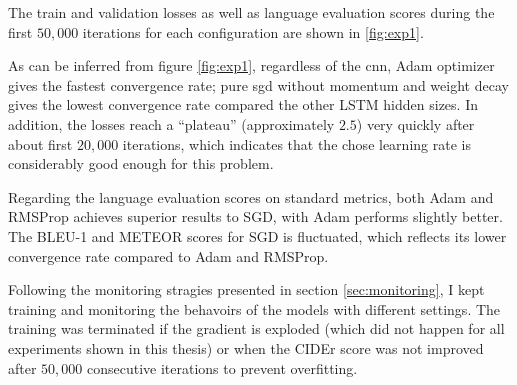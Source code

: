 The train and validation losses as well as language evaluation scores during the first $50,000$ iterations for each configuration are shown in \ref{fig:exp1}. 

As can be inferred from figure \ref{fig:exp1}, regardless of the \gls{cnn}, Adam optimizer gives the fastest convergence rate; pure \gls{sgd} without momentum and weight decay gives the lowest convergence rate compared the other LSTM hidden sizes. In addition, the losses reach a ``plateau'' (approximately $2.5$) very quickly after about first $20,000$ iterations, which indicates that the chose learning rate is considerably good enough for this problem.  

Regarding the language evaluation scores on standard metrics, both Adam and RMSProp achieves superior results to SGD, with Adam performs slightly better. The BLEU-1 and METEOR scores for SGD is fluctuated, which reflects its lower convergence rate compared to Adam and RMSProp.

Following the monitoring stragies presented in section \ref{sec:monitoring}, I kept training and monitoring the behavoirs of the models with different settings. The training was terminated if the gradient is exploded (which did not happen for all experiments shown in this thesis) or when the CIDEr score was not improved after $50,000$ consecutive iterations to prevent overfitting. 

